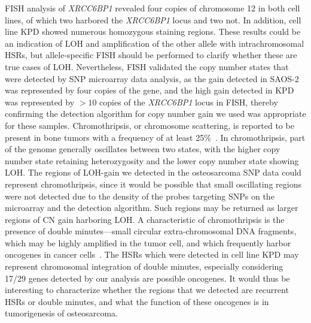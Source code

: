 FISH analysis of {\it XRCC6BP1} revealed four copies of chromosome 12 in both cell lines, of which two harbored the {\it XRCC6BP1} locus and two not. In addition, cell line KPD showed numerous homozygous staining regions. These results could be an indication of LOH and amplification of the other allele with intrachromosomal HSRs, but allele\hyp{}specific FISH should be performed to clarify whether these are true cases of LOH. Nevertheless, FISH validated the copy number states that were detected by SNP microarray data analysis, as the gain detected in SAOS-2 was represented by four copies of the gene, and the high gain detected in KPD was represented by $>10$ copies of the {\it XRCC6BP1} locus in FISH, thereby confirming the detection algorithm for copy number gain we used was appropriate for these samples. Chromothripsis, or chromosome scattering, is reported to be present in bone tumors with a frequency of at least 25\%~\cite{stephens2011massive}. In chromothripsis, part of the genome generally oscillates between two states, with the higher copy number state retaining heterozygosity and the lower copy number state showing LOH. The regions of LOH-gain we detected in the osteosarcoma SNP data could represent chromothripsis, since it would be possible that small oscillating regions were not detected due to the density of the probes targeting SNPs on the microarray and the detection algorithm. Such regions may be returned as larger regions of CN gain harboring LOH. A characteristic of chromothripsis is the presence of double minutes---small circular extra-chromosomal DNA fragments, which may be highly amplified in the tumor cell, and which frequently harbor oncogenes in cancer cells~\cite{forment2012chromothripsis}. The HSRs which were detected in cell line KPD may represent chromosomal integration of double minutes, especially considering 17/29 genes detected by our analysis are possible oncogenes. It would thus be interesting to characterize whether the regions that we detected are recurrent HSRs or double minutes, and what the function of these oncogenes is in tumorigenesis of osteosarcoma.


\begin{small}
\begin{singlespace}

\end{singlespace}
\end{small}

